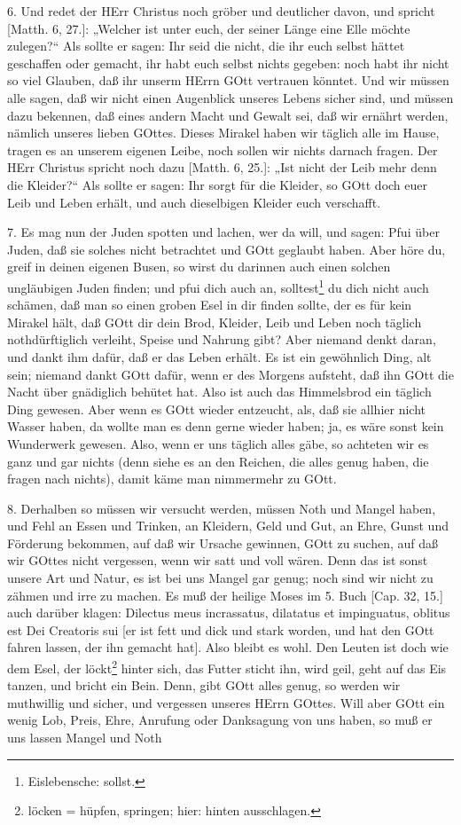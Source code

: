 6. Und redet der HErr Christus noch gröber und deutlicher davon, und spricht [Matth. 6, 27.]: „Welcher ist unter euch, der seiner Länge eine Elle möchte zulegen?“ Als sollte er sagen: Ihr seid die nicht, die ihr euch selbst hättet geschaffen oder gemacht, ihr habt euch selbst nichts gegeben: noch habt ihr nicht so viel Glauben, daß ihr unserm HErrn GOtt vertrauen könntet. Und wir müssen alle sagen, daß wir nicht einen Augenblick unseres Lebens sicher sind, und müssen dazu bekennen, daß eines andern Macht und Gewalt sei, daß wir ernährt werden, nämlich unseres lieben GOttes. Dieses Mirakel haben wir täglich alle im Hause, tragen es an unserem eigenen Leibe, noch sollen wir nichts darnach fragen. Der HErr Christus spricht noch dazu [Matth. 6, 25.]: „Ist nicht der Leib mehr denn die Kleider?“ Als sollte er sagen: Ihr sorgt für die Kleider, so GOtt doch euer Leib und Leben erhält, und auch dieselbigen Kleider euch verschafft.

7. Es mag nun der Juden spotten und lachen, wer da will, und sagen: Pfui über Juden, daß sie solches nicht betrachtet und GOtt geglaubt haben. Aber höre du, greif in deinen eigenen Busen, so wirst du darinnen auch einen solchen ungläubigen Juden finden; und pfui dich auch an, solltest\footnote{Eislebensche: sollst.} du dich nicht auch schämen, daß man so einen groben Esel in dir finden sollte, der es für kein Mirakel hält, daß GOtt dir dein Brod, Kleider, Leib und Leben noch täglich nothdürftiglich verleiht, Speise und Nahrung gibt? Aber niemand denkt daran, und dankt ihm dafür, daß er das Leben erhält. Es ist ein gewöhnlich Ding, alt sein; niemand dankt GOtt dafür, wenn er des Morgens aufsteht, daß ihn GOtt die Nacht über gnädiglich behütet hat. Also ist auch das Himmelsbrod ein täglich Ding gewesen. Aber wenn es GOtt wieder entzeucht, als, daß sie allhier nicht Wasser haben, da wollte man es denn gerne wieder haben; ja, es wäre sonst kein Wunderwerk gewesen. Also, wenn er uns täglich alles gäbe, so achteten wir es ganz und gar nichts (denn siehe es an den Reichen, die alles genug haben, die fragen nach nichts), damit käme man nimmermehr zu GOtt.

8. Derhalben so müssen wir versucht werden, müssen Noth und Mangel haben, und Fehl an Essen und Trinken, an Kleidern, Geld und Gut, an Ehre, Gunst und Förderung bekommen, auf daß wir Ursache gewinnen, GOtt zu suchen, auf daß wir GOttes nicht vergessen, wenn wir satt und voll wären. Denn das ist sonst unsere Art und Natur, es ist bei uns Mangel gar genug; noch sind wir nicht zu zähmen und irre zu machen. Es muß der heilige Moses im 5. Buch [Cap. 32, 15.] auch darüber klagen: Dilectus meus incrassatus, dilatatus et impinguatus, oblitus est Dei Creatoris sui [er ist fett und dick und stark worden, und hat den GOtt fahren lassen, der ihn gemacht hat]. Also bleibt es wohl. Den Leuten ist doch wie dem Esel, der löckt\footnote{löcken = hüpfen, springen; hier: hinten ausschlagen.} hinter sich, das Futter sticht ihn, wird geil, geht auf das Eis tanzen, und bricht ein Bein. Denn, gibt GOtt alles genug, so werden wir muthwillig und sicher, und vergessen unseres HErrn GOttes. Will aber GOtt ein wenig Lob, Preis, Ehre, Anrufung oder Danksagung von uns haben, so muß er uns lassen Mangel und Noth

